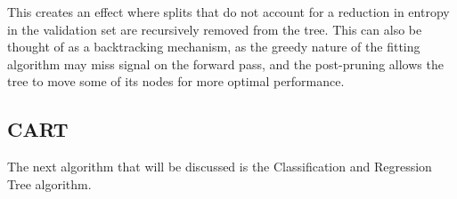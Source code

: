 \documentclass{amsart}
\begin{document}
    This creates an effect where splits that do not account for a reduction in entropy in the validation set are
    recursively removed from the tree. This can also be thought of as a backtracking mechanism, as the greedy nature
    of the fitting algorithm may miss signal on the forward pass, and the post-pruning allows the tree to
    move some of its nodes for more optimal performance.

    \subsection{CART}
    The next algorithm that will be discussed is the Classification and Regression Tree algorithm.
\end{document}
